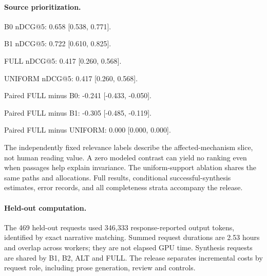 \paragraph{Source prioritization.}

B0 nDCG@5: 0.658 [0.538, 0.771].

B1 nDCG@5: 0.722 [0.610, 0.825].

FULL nDCG@5: 0.417 [0.260, 0.568].

UNIFORM nDCG@5: 0.417 [0.260, 0.568].

Paired FULL minus B0: -0.241 [-0.433, -0.050].

Paired FULL minus B1: -0.305 [-0.485, -0.119].

Paired FULL minus UNIFORM: 0.000 [0.000, 0.000].

The independently fixed relevance labels describe the affected-mechanism slice, not human reading value. A zero modeled contrast can yield no ranking even when passages help explain invariance. The uniform-support ablation shares the same paths and allocations. Full results, conditional successful-synthesis estimates, error records, and all completeness strata accompany the release.

\paragraph{Held-out computation.}

The 469 held-out requests used 346,333 response-reported output tokens, identified by exact narrative matching. Summed request durations are 2.53 hours and overlap across workers; they are not elapsed GPU time. Synthesis requests are shared by B1, B2, ALT and FULL. The release separates incremental costs by request role, including prose generation, review and controls.
